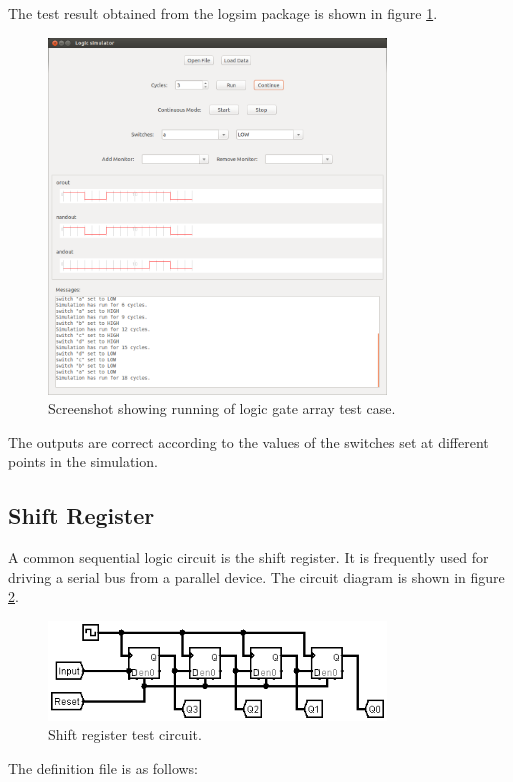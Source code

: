 \documentclass[a4paper,10pt]{article}  %
\begin{document}
The test result obtained from the logsim package is shown in figure \ref{fig:testlgss}.
\begin{figure}[!htb]
  \begin{center}
    \includegraphics[width=0.8\textwidth]{testgates_screenshot.png}
  \end{center}
  \caption{Screenshot showing running of logic gate array test case.}
  \label{fig:testlgss}
\end{figure}
The outputs are correct according to the values of the switches set at
different points in the simulation.

\subsection{Shift Register}

A common sequential logic circuit is the shift register. It is
frequently used for driving a serial bus from a parallel device. The
circuit diagram is shown in figure \ref{fig:testsrcct}.
\begin{figure}[!htb]
  \begin{center}
    \includegraphics[width=0.8\textwidth]{shiftregister_schem.png}
  \end{center}
  \caption{Shift register test circuit.}
  \label{fig:testsrcct}
\end{figure}
The definition file is as follows:

\end{document}
